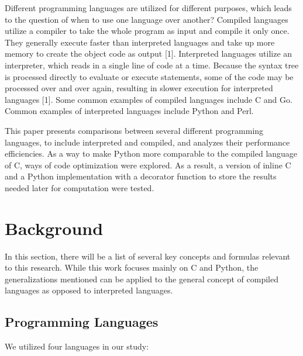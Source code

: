 \documentclass{sig-alternate}
\begin{document}
Different programming languages are utilized for different purposes, which leads to the question of when to use one language over another? Compiled languages utilize a compiler to take the whole program as input and compile it only once. They generally execute faster than interpreted languages and take up more memory to create the object code as output [1]. Interpreted languages utilize an interpreter, which reads in a single line of code at a time. Because the syntax tree is processed directly to evaluate or execute statements, some of the code may be processed over and over again, resulting in slower execution for interpreted languages [1]. Some common examples of compiled languages include C and Go. Common examples of interpreted languages include Python and Perl. 

This paper presents comparisons between several different programming languages, to include interpreted and compiled, and analyzes their performance efficiencies. As a way to make Python more comparable to the compiled language of C, ways of code optimization were explored. As a result, a version of inline C and a Python implementation with a decorator function to store the results needed later for computation were tested.

\section{Background}

In this section, there will be a list of several key concepts and formulas relevant to this research. While this work focuses mainly on C and Python, the generalizations mentioned can be applied to the general concept of compiled languages as opposed to interpreted languages. 

\subsection{Programming Languages}	

We utilized four languages in our study:
\end{document}
